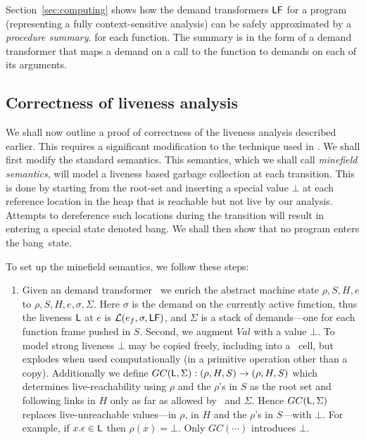\documentclass[9pt]{sigplanconf}
\newcommand{\bang}{\mbox{\sc bang}}
\begin{document}
Section~\ref{sec:computing}   shows   how   the  demand   transformers
$\mathsf{LF}$  for  a  program  (representing  a  fully  context-sensitive
analysis) can be safely approximated by a {\em procedure summary}. for
each function.   The summary  is in the  form of a  demand transformer
that maps a demand on a call to the function to demands on each of its
arguments.

\subsection{Correctness of liveness analysis}  
 
We shall now  outline a proof of correctness  of the liveness analysis
described earlier.   This requires  a significant modification  to the
technique  used  in  \cite{asati14lgc}.   We shall  first  modify  the
standard semantics. This semantics, which we shall call {\em minefield
  semantics}, will  model a liveness based garbage  collection at each
transition. This is done by starting from the root-set and inserting a
special value  $\bot$ at each reference  location in the  heap that is
reachable but not live by  our analysis.  Attempts to dereference such
locations  during the  transition will  result in  entering  a special
state denoted  \bang.  We shall then  show that no  program enters the
\bang\ state.
 
To set up the minefield semantics, we follow these steps:
\begin{enumerate}
\item Given an  demand transformer \Lfonly\  we enrich  the abstract machine
  state  $\rho, S,  H, e$  to $\rho,  S, H,  e, \sigma,  \Sigma$. Here
  $\sigma$ is  the demand on  the currently active function,  thus the
  liveness $\mathsf{L}$   at $e$ is $\mathcal{L}(e_f, \sigma, \mathsf{LF})$, and
  $\Sigma$ is a stack of  demands---one for each function frame pushed
  in $S$.   Second, we  augment $Val$ with  a value $\bot$.   To model
  strong  liveness  $\bot$ may  be  copied  freely,  including into  a
  \CONS\ cell, but explodes  when used computationally (in a primitive
  operation other  than a copy). Additionally we  define $GC (\mathsf{L},
  \Sigma) : (\rho, H, S) \rightarrow (\rho , H , S )$ which determines
  live-reachability using $\rho$  and the $\rho$'s in $S$  as the root
  set  and  following  links  in   $H$  only  as  far  as  allowed  by
  \Lv\  and  $\Sigma$.   Hence  $GC  (\mathsf{L},  \Sigma)$  replaces
  live-unreachable  values---in  $\rho$,  in  $H$ and  the  $\rho$'s  in
  $S$---with  $\bot$.  For  example,  if $x.\epsilon  \in \mathsf{L}$  then
  $\rho (x) = \bot$.  Only $GC (\cdots )$ introduces $\bot$. 
\end{enumerate}  
\end{document}
